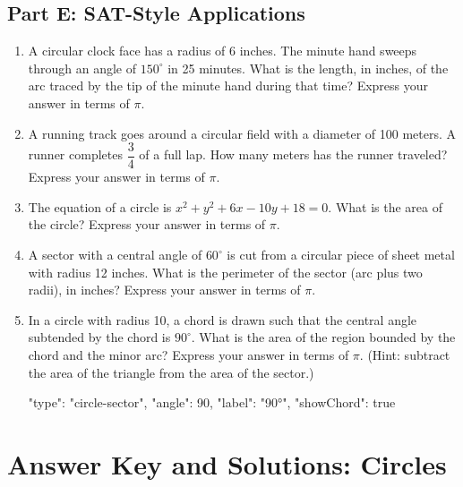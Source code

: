 \documentclass[14pt]{extarticle}
\begin{document}
\subsection*{Part E: SAT-Style Applications}
\begin{enumerate}
  \item A circular clock face has a radius of 6 inches. The minute hand sweeps through an angle of \(150^\circ\) in 25 minutes. What is the length, in inches, of the arc traced by the tip of the minute hand during that time? Express your answer in terms of \(\pi\).
  \item A running track goes around a circular field with a diameter of 100 meters. A runner completes \(\dfrac{3}{4}\) of a full lap. How many meters has the runner traveled? Express your answer in terms of \(\pi\).
  \item The equation of a circle is \(x^2 + y^2 + 6x - 10y + 18 = 0\). What is the area of the circle? Express your answer in terms of \(\pi\).
  \item A sector with a central angle of \(60^\circ\) is cut from a circular piece of sheet metal with radius 12 inches. What is the perimeter of the sector (arc plus two radii), in inches? Express your answer in terms of \(\pi\).
  \item In a circle with radius 10, a chord is drawn such that the central angle subtended by the chord is \(90^\circ\). What is the area of the region bounded by the chord and the minor arc? Express your answer in terms of \(\pi\). (Hint: subtract the area of the triangle from the area of the sector.)
  \begin{diagramdata}
  {
    "type": "circle-sector",
    "angle": 90,
    "label": "90°",
    "showChord": true
  }
  \end{diagramdata}
\end{enumerate}

\newpage

\section*{Answer Key and Solutions: Circles}
\end{document}
